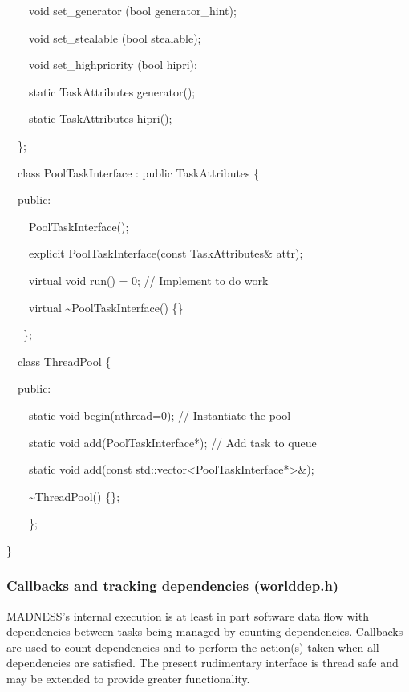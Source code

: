 \documentclass[letterpaper]{article}
\begin{document}
{\ttfamily
\ \ \ \ void set\_generator (bool generator\_hint);}

{\ttfamily
\ \ \ \ void set\_stealable (bool stealable);}

{\ttfamily
\ \ \ \ void set\_highpriority (bool hipri);}

{\ttfamily
\ \ \ \ static TaskAttributes generator();}

{\ttfamily
\ \ \ \ static TaskAttributes hipri();}

{\ttfamily
\ \ \};}


\bigskip

{\ttfamily
\ \ class PoolTaskInterface : public TaskAttributes \{}

{\ttfamily
\ \ public:}

{\ttfamily
\ \ \ \ PoolTaskInterface();}

{\ttfamily
\ \ \ \ explicit PoolTaskInterface(const TaskAttributes\& attr);}

{\ttfamily
\ \ \ \ virtual void run() = 0; // Implement to do work}

{\ttfamily
\ \ \ \ virtual \~{}PoolTaskInterface() \{\}}

{\ttfamily
\ \ \ \};}


\bigskip

{\ttfamily
\ \ class ThreadPool \{}

{\ttfamily
\ \ public:}

{\ttfamily
\ \ \ \ static void begin(nthread=0); // Instantiate the pool}

{\ttfamily
\ \ \ \ static void add(PoolTaskInterface*); // Add task to queue}

{\ttfamily
\ \ \ \ static void add(const std::vector{\textless}PoolTaskInterface*{\textgreater}\&);}

{\ttfamily
\ \ \ \ \~{}ThreadPool() \{\};}

{\ttfamily
\ \ \ \ \};}

{\ttfamily
\}}

\subsubsection{Callbacks and tracking dependencies (worlddep.h)}
MADNESS's internal execution is at least in part software data flow with dependencies between tasks being managed by
counting dependencies. Callbacks are used to count dependencies and to perform the action(s) taken when all
dependencies are satisfied. The present rudimentary interface is thread safe and may be extended to provide greater
functionality.
\end{document}
